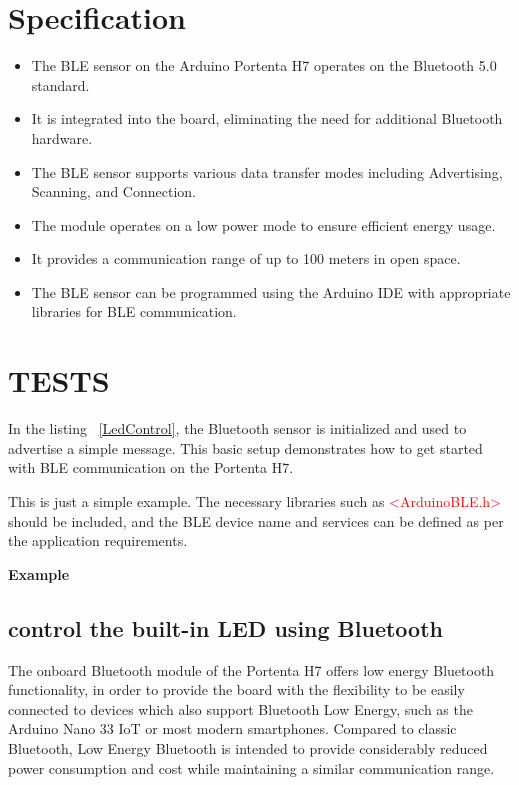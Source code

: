 \section{Specification}

\begin{itemize}
	
	\item The BLE sensor on the Arduino Portenta H7 operates on the Bluetooth 5.0 standard.
	\item It is integrated into the board, eliminating the need for additional Bluetooth hardware.
	\item The BLE sensor supports various data transfer modes including Advertising, Scanning, and Connection.
	\item The module operates on a low power mode to ensure efficient energy usage.
	\item It provides a communication range of up to 100 meters in open space.
	\item The BLE sensor can be programmed using the Arduino IDE with appropriate libraries for BLE communication. \cite{PortentaH7BLE:2024}
	
\end{itemize}


\section{TESTS}
In the listing  ~\ref{LedControl}, the Bluetooth sensor is initialized and used to advertise a simple message. This basic setup demonstrates how to get started with BLE communication on the Portenta H7.

{
	\label{LedControl}
}


This is just a simple example. The necessary libraries such as \textcolor{red}{<ArduinoBLE.h>} should be included, and the BLE device name and services can be defined as per the application requirements. \cite{PortentaH7BLE:2024}


\textbf{Example}

\subsection{control the built-in LED using Bluetooth}
The onboard Bluetooth module of the Portenta H7 offers low energy Bluetooth functionality, in order to provide the board with the flexibility to be easily connected to devices which also support Bluetooth Low Energy, such as the Arduino Nano 33 IoT or most modern smartphones. Compared to classic Bluetooth, Low Energy Bluetooth is intended to provide considerably reduced power consumption and cost while maintaining a similar communication range. \cite{PortentaH7BLE:2024}

